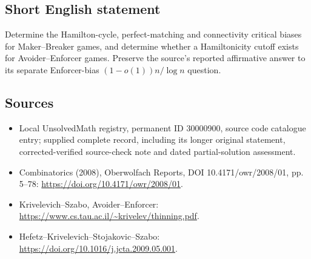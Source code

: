 \documentclass[11pt]{article}
\begin{document}
\subsection{Short English statement}
Determine the Hamilton-cycle, perfect-matching and connectivity critical biases for Maker--Breaker games, and determine whether a Hamiltonicity cutoff exists for Avoider--Enforcer games. Preserve the source's reported affirmative answer to its separate Enforcer-bias $(1-o(1))n/\log n$ question.
\subsection{Sources}
\begin{itemize}
\item Local UnsolvedMath registry, permanent ID 30000900, source code catalogue entry; supplied complete record, including its longer original statement, corrected-verified source-check note and dated partial-solution assessment.
\item Combinatorics (2008), Oberwolfach Reports, DOI 10.4171/owr/2008/01, pp. 5--78: \url{https://doi.org/10.4171/owr/2008/01}.
\item Krivelevich--Szabo, Avoider--Enforcer: \url{https://www.cs.tau.ac.il/~krivelev/thinning.pdf}.
\item Hefetz--Krivelevich--Stojakovic--Szabo: \url{https://doi.org/10.1016/j.jcta.2009.05.001}.
\end{itemize}
\end{document}

